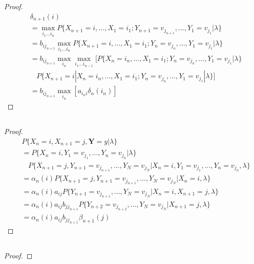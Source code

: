 \documentclass[runningheads]{llncs}
\begin{document}
    \subsection{}
    \begin{proof}
        \begin{align}
            &\delta_{n+1}(i) \\
            &= \max_{i_1...i_{n}} P \{ X_{n+1} = i,..., X_1 = i_1; Y_{n+1} = v_{j_{n+1}},..., Y_1 = v_{j_1} |\lambda \} \\
            &= b_{i j_{n+1}} \max_{i_1...i_{n}} P \{ X_{n+1} = i,..., X_1 = i_1; Y_{n} = v_{j_n},..., Y_1 = v_{j_1} |\lambda \} \\
            &= b_{i j_{n+1}} \max_{i_n} \max_{i_1...i_{n-1}} [ P \{ X_{n} = i_n,..., X_1 = i_1; Y_{n} = v_{j_n},..., Y_1 = v_{j_1} |\lambda \} \\
            & \ \ \ \ P \{ X_{n+1} = i | X_{n} = i_n,..., X_1 = i_1; Y_{n} = v_{j_n},..., Y_1 = v_{j_1} |\lambda \} ] \\
            &= b_{i j_{n+1}} \max_{i_n} [a_{i_n i} \delta_{n}(i_n)]
        \end{align}
    \end{proof}
    \subsection{}
    \begin{proof}
        \begin{align}
            &P \{ X_n = i, X_{n+1} = j, \mathbf{Y} = y | \lambda \} \\
            &= P \{ X_n = i, Y_1 = v_{j_1},..., Y_n = v_{j_n} | \lambda \} \\
            & \ \ \ \ P \{ X_{n+1} = j, Y_{n+1} = v_{j_{n+1}},..., Y_N = v_{j_N} | X_n = i, Y_1 = v_{j_1},..., Y_n = v_{j_n}, \lambda \} \\ 
            &= \alpha_n(i) P \{ X_{n+1} = j, Y_{n+1} = v_{j_{n+1}},..., Y_N = v_{j_N} | X_n = i, \lambda \} \\
            &= \alpha_n(i) a_{ij} P \{ Y_{n+1} = v_{j_{n+1}},..., Y_N = v_{j_N} | X_n = i, X_{n+1} = j, \lambda \} \\
            &= \alpha_n(i) a_{ij} b_{jj_{n+1}} P \{ Y_{n+2} = v_{j_{n+2}},..., Y_N = v_{j_N} | X_{n+1} = j, \lambda \} \\
            &= \alpha_n(i) a_{ij} b_{jj_{n+1}} \beta_{n+1} (j)
        \end{align}
    \end{proof}
    \subsection{}
    \begin{proof}
        
    \end{proof}
    
\end{document}
